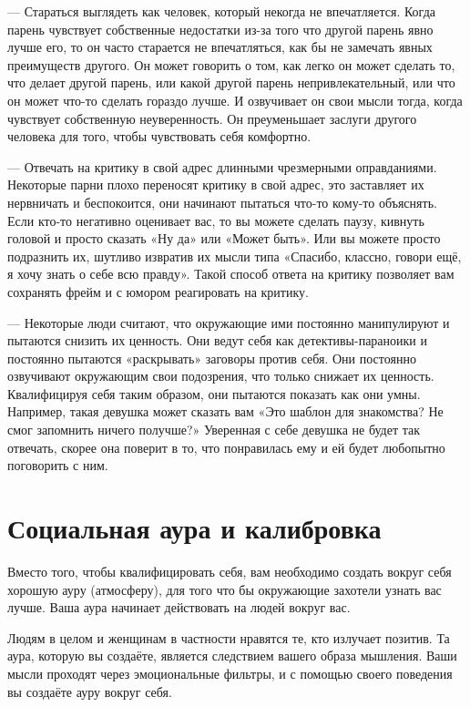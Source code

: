 --- Стараться выглядеть как человек, который некогда не впечатляется. Когда парень чувствует собственные недостатки из-за того что другой парень явно лучше его, то он часто старается не впечатляться, как бы не замечать явных преимуществ другого. Он может говорить о том, как легко он может сделать то, что делает другой парень, или какой другой парень непривлекательный, или что он может что-то сделать гораздо лучше. И озвучивает он свои мысли тогда, когда чувствует собственную неуверенность. Он преуменьшает заслуги другого человека для того, чтобы чувствовать себя комфортно.

--- Отвечать на критику в свой адрес длинными чрезмерными оправданиями. Некоторые парни плохо переносят критику в свой адрес, это заставляет их нервничать и беспокоится, они начинают пытаться что-то кому-то объяснять. Если кто-то негативно оценивает вас, то вы можете сделать паузу, кивнуть головой и просто сказать «Ну да» или «Может быть». Или вы можете просто подразнить их, шутливо извратив их мысли типа «Спасибо, классно, говори ещё, я хочу знать о себе всю правду». Такой способ ответа на критику позволяет вам сохранять фрейм и с юмором реагировать на критику.

--- Некоторые люди считают, что окружающие ими постоянно манипулируют и пытаются снизить их ценность. Они ведут себя как детективы-параноики и постоянно пытаются «раскрывать» заговоры против себя. Они постоянно озвучивают окружающим свои подозрения, что только снижает их ценность. Квалифицируя себя таким образом, они пытаются показать как они умны. Например, такая девушка может сказать вам «Это шаблон для знакомства? Не смог запомнить ничего получше?» Уверенная с себе девушка не будет так отвечать, скорее она поверит в то, что понравилась ему и ей будет любопытно поговорить с ним.
\chapter{Социальная аура и калибровка}

Вместо того, чтобы квалифицировать себя, вам необходимо создать вокруг себя хорошую ауру (атмосферу), для того что бы окружающие захотели узнать вас лучше. Ваша аура начинает действовать на людей вокруг вас.

Людям в целом и женщинам в частности нравятся те, кто излучает позитив. Та аура, которую вы создаёте, является следствием вашего образа мышления. Ваши мысли проходят через эмоциональные фильтры, и с помощью своего поведения вы создаёте ауру вокруг себя.

